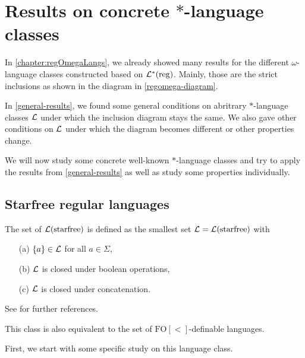 \section{Results on concrete $*$-language classes}
\label{concrete-results}

In \cref{chapter:regOmegaLangs}, we already showed many results for the different $\omega$-language classes constructed based on $\mathcal{L}^*(\textup{\textrm{reg}})$. Mainly, those are the strict inclusions as shown in the diagram in \cref{regomega-diagram}.

In \cref{general-results}, we found some general conditions on abritrary $*$-language classes $\mathcal{L}$ under which the inclusion diagram stays the same. We also gave other conditions on $\mathcal{L}$ under which the diagram becomes different or other properties change.

We will now study some concrete well-known $*$-language classes and try to apply the results from \cref{general-results} as well as study some properties individually.


\subsection{Starfree regular languages}
The set of  $\mathcal{L}(\textup{\textrm{starfree}})$ is defined as the smallest set $\mathcal{L} = \mathcal{L}(\textup{\textrm{starfree}})$ with
\begin{itemize}
\item[(a)] $\Set{a} \in \Lang$ for all $a \in \Sigma$,
\item[(b)] $\mathcal{L}$ is closed under boolean operations,
\item[(c)] $\mathcal{L}$ is closed under concatenation.
\end{itemize}
See \cite[Section 2.2]{ConcHierR104} for further references.

This class is also equivalent to the set of $\mathrm{FO[<]}$-definable languages. %

First, we start with some specific study on this language class.

